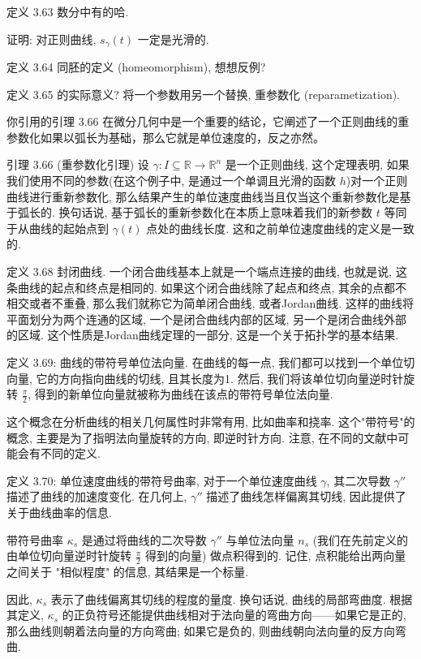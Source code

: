 \documentclass[a4paper]{ctexart}
\begin{document}
定义 3.63 数分中有的哈.

证明: 对正则曲线, $s_\gamma(t)$ 一定是光滑的.

定义 3.64 同胚的定义 (homeomorphism), 想想反例?

定义 3.65 的实际意义? 将一个参数用另一个替换, 重参数化 (reparametization).

你引用的引理 3.66 在微分几何中是一个重要的结论，它阐述了一个正则曲线的重参数化如果以弧长为基础，那么它就是单位速度的，反之亦然。

引理 3.66 (重参数化引理) 设 $\gamma: I \subseteq \mathbb{R} \rightarrow \mathbb{R}^n$ 是一个正则曲线, 这个定理表明, 
如果我们使用不同的参数(在这个例子中, 是通过一个单调且光滑的函数 $h$)对一个正则曲线进行重新参数化, 
那么结果产生的单位速度曲线当且仅当这个重新参数化是基于弧长的. 
换句话说, 基于弧长的重新参数化在本质上意味着我们的新参数 $t$ 等同于从曲线的起始点到 $\gamma(t)$ 点处的曲线长度. 
这和之前单位速度曲线的定义是一致的. 


定义 3.68 封闭曲线. 一个闭合曲线基本上就是一个端点连接的曲线, 也就是说, 这条曲线的起点和终点是相同的. 
如果这个闭合曲线除了起点和终点, 其余的点都不相交或者不重叠, 那么我们就称它为简单闭合曲线, 或者Jordan曲线. 
这样的曲线将平面划分为两个连通的区域, 一个是闭合曲线内部的区域, 另一个是闭合曲线外部的区域. 
这个性质是Jordan曲线定理的一部分, 这是一个关于拓扑学的基本结果. 

定义 3.69: 曲线的带符号单位法向量. 在曲线的每一点, 我们都可以找到一个单位切向量, 它的方向指向曲线的切线, 
且其长度为1. 然后, 我们将该单位切向量逆时针旋转 $\frac{\pi}{2}$, 得到的新单位向量就被称为曲线在该点的带符号单位法向量.

这个概念在分析曲线的相关几何属性时非常有用, 比如曲率和挠率. 这个"带符号"的概念, 
主要是为了指明法向量旋转的方向, 即逆时针方向. 注意, 在不同的文献中可能会有不同的定义. 

定义 3.70: 单位速度曲线的带符号曲率, 对于一个单位速度曲线 $\gamma$, 
其二次导数 $\gamma''$ 描述了曲线的加速度变化. 在几何上, $\gamma''$ 描述了曲线怎样偏离其切线, 
因此提供了关于曲线曲率的信息. 

带符号曲率 $\kappa_s$ 是通过将曲线的二次导数 $\gamma''$ 与单位法向量 $n_s$
(我们在先前定义的由单位切向量逆时针旋转 $\frac{\pi}{2}$ 得到的向量) 做点积得到的. 
记住, 点积能给出两向量之间关于 "相似程度" 的信息, 其结果是一个标量. 

因此, $\kappa_s$ 表示了曲线偏离其切线的程度的量度. 换句话说, 
曲线的局部弯曲度. 根据其定义, $\kappa_s$ 的正负符号还能提供曲线相对于法向量的弯曲方向——如果它是正的, 
那么曲线则朝着法向量的方向弯曲; 如果它是负的, 则曲线朝向法向量的反方向弯曲. 
\end{document}
